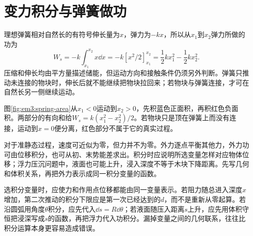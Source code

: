 \section{变力积分与弹簧做功}

理想弹簧相对自然长的有符号伸长量为$x$，弹力为$-kx$，所以从$x_1$到$x_2$弹力所做的功为
\[
W_s=-k\int_{x_1}^{x_2}x\dd x
=-k[x^2/2]_{x_1}^{x_2}
=\frac12kx_1^2-\frac12kx_2^2.
\]
压缩和伸长均由平方量描述储能，但运动方向和接触条件仍须另外判断。弹簧只推动未连接的物块时，伸长后就不能继续把物块拉回来；若物块与弹簧连接，才可在自然长另一侧继续运动。

图\ref{fig:em3:spring-area}从$x_1<0$运动到$x_2>0$，先积蓝色正面积，再积红色负面积。两部分的有向和给$W_s=k(x_1^2-x_2^2)/2$。若物块只是顶在弹簧上而没有连接，运动到$x=0$便分离，红色部分不属于它的真实过程。


对于准静态过程，速度可近似为零，但力并不为零。外力逐点平衡其他力，外力功可由位移积分，也可从初、末势能差求出。积分时应说明所选变量怎样对应物体位移；浮力压沉问题中，液面也可能上升，浸入深度不等于木块下降距离。先写几何和体积关系，再把外力表示成同一积分变量的函数。

选积分变量时，应使力和作用点位移都能由同一变量表示。若阻力随总进入深度$x$增加，第二次推动的积分下限应是第一次已经达到的$d$，而不是重新从零起算。若沿圆弧用角度$\theta$积分，应先代入$\dd s=R\dd\theta$；若液面随压入距离$s$上升，应先用体积守恒把浸深写成$s$的函数，再把浮力代入功积分。漏掉变量之间的几何联系，往往比积分运算本身更容易造成错误。

